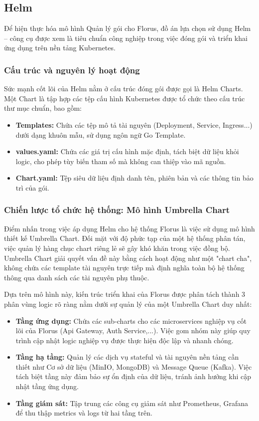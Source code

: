\subsection{Helm}

Để hiện thực hóa mô hình Quản lý gói cho Florus, đồ án lựa chọn sử dụng Helm – công cụ được xem là tiêu chuẩn công nghiệp trong việc đóng gói và triển khai ứng dụng trên nền tảng Kubernetes.

\subsubsection{Cấu trúc và nguyên lý hoạt động} Sức mạnh cốt lõi của Helm nằm ở cấu trúc đóng gói được gọi là Helm Charts. Một Chart là tập hợp các tệp cấu hình Kubernetes được tổ chức theo cấu trúc thư mục chuẩn, bao gồm: 
\begin{itemize} 
    \item \textbf{Templates:} Chứa các tệp mô tả tài nguyên (Deployment, Service, Ingress...) dưới dạng khuôn mẫu, sử dụng ngôn ngữ Go Template. 
    \item \textbf{values.yaml:} Chứa các giá trị cấu hình mặc định, tách biệt dữ liệu khỏi logic, cho phép tùy biến tham số mà không can thiệp vào mã nguồn. 
    \item \textbf{Chart.yaml:} Tệp siêu dữ liệu định danh tên, phiên bản và các thông tin bảo trì của gói. 
\end{itemize}

\subsubsection{Chiến lược tổ chức hệ thống: Mô hình Umbrella Chart} 
Điểm nhấn trong việc áp dụng Helm cho hệ thống Florus là việc sử dụng mô hình thiết kế Umbrella Chart. Đối mặt với độ phức tạp của một hệ thống phân tán, việc quản lý hàng chục chart riêng lẻ sẽ gây khó khăn trong việc đồng bộ. Umbrella Chart giải quyết vấn đề này bằng cách hoạt động như một "chart cha", không chứa các template tài nguyên trực tiếp mà định nghĩa toàn bộ hệ thống thông qua danh sách các tài nguyên phụ thuộc.

Dựa trên mô hình này, kiến trúc triển khai của Florus được phân tách thành 3 phân vùng logic rõ ràng nằm dưới sự quản lý của một Umbrella Chart duy nhất: 
\begin{itemize} 
    \item \textbf{Tầng ứng dụng:} Chứa các sub-charts cho các microservices nghiệp vụ cốt lõi của Florus (Api Gateway, Auth Service,...). Việc gom nhóm này giúp quy trình cập nhật logic nghiệp vụ được thực hiện độc lập và nhanh chóng. 
    \item \textbf{Tầng hạ tầng:} Quản lý các dịch vụ stateful và tài nguyên nền tảng cần thiết như Cơ sở dữ liệu (MinIO, MongoDB) và Message Queue (Kafka). Việc tách biệt tầng này đảm bảo sự ổn định của dữ liệu, tránh ảnh hưởng khi cập nhật tầng ứng dụng.
    \item \textbf{Tầng giám sát:} Tập trung các công cụ giảm sát như Prometheus, Grafana để thu thập metrics và logs từ hai tầng trên.
\end{itemize}

